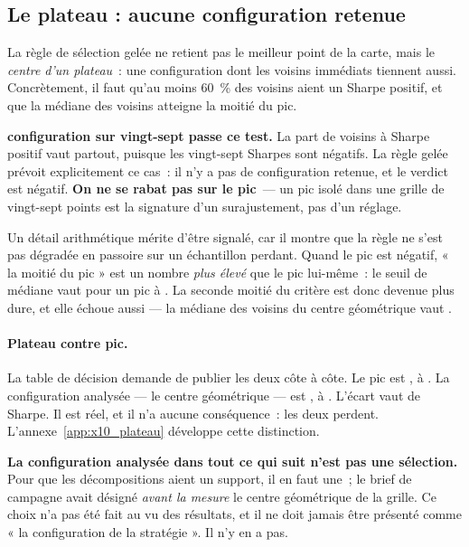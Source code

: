 \subsection{Le plateau : aucune configuration retenue}

La règle de sélection gelée ne retient pas le meilleur point de la carte, mais
le \emph{centre d'un plateau}~: une configuration dont les voisins immédiats
tiennent aussi. Concrètement, il faut qu'au moins 60~\% des voisins aient un
Sharpe positif, et que la médiane des voisins atteigne la moitié du pic.

\begin{warningbox}
\textbf{\XTenPlateauPassing{} configuration sur vingt-sept passe ce test.} La
part de voisins à Sharpe positif vaut \XTenPlateauShareNeighbours{} partout,
puisque les vingt-sept Sharpes sont négatifs. La règle gelée prévoit
explicitement ce cas~: il n'y a pas de configuration retenue, et le verdict
est négatif. \textbf{On ne se rabat pas sur le pic}~--- un pic isolé dans une
grille de vingt-sept points est la signature d'un surajustement, pas d'un
réglage.
\end{warningbox}

Un détail arithmétique mérite d'être signalé, car il montre que la règle ne
s'est pas dégradée en passoire sur un échantillon perdant. Quand le pic est
négatif, « la moitié du pic » est un nombre \emph{plus élevé} que le pic
lui-même~: le seuil de médiane vaut \XTenPlateauThreshold{} pour un pic à
\XTenPeakSharpe. La seconde moitié du critère est donc devenue plus dure, et
elle échoue aussi --- la médiane des voisins du centre géométrique vaut
\XTenPlateauMedianNeighbour.

\paragraph{Plateau contre pic.} La table de décision demande de publier les
deux côte à côte. Le pic est \XTenPeakConfig, à \XTenPeakSharpe. La
configuration analysée --- le centre géométrique --- est \XTenAnalysedConfig,
à \XTenSharpeIS. L'écart vaut \XTenSharpeGapPeak{} de Sharpe. Il est réel, et
il n'a aucune conséquence~: les deux perdent. L'annexe~\ref{app:x10_plateau}
développe cette distinction.

\begin{insightbox}
\textbf{La configuration analysée dans tout ce qui suit n'est pas une
sélection.} Pour que les décompositions aient un support, il en faut une~;
le brief de campagne avait désigné \emph{avant la mesure} le centre
géométrique de la grille. Ce choix n'a pas été fait au vu des résultats, et il
ne doit jamais être présenté comme « la configuration de la stratégie ». Il
n'y en a pas.
\end{insightbox}

